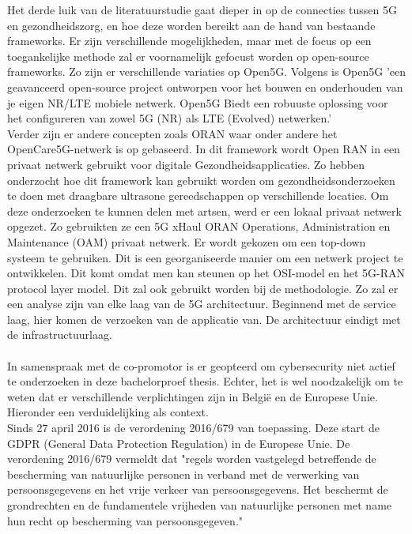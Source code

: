Het derde luik van de literatuurstudie gaat dieper in op de connecties tussen 5G en gezondheidszorg, en hoe deze worden bereikt aan de hand van bestaande frameworks. Er zijn verschillende mogelijkheden, maar met de focus op een toegankelijke methode zal er voornamelijk gefocust worden op open-source frameworks. Zo zijn er verschillende variaties op Open5G. Volgens \textcite{Open5GS2024} is Open5G 'een geavanceerd open-source project ontworpen voor het bouwen en onderhouden van je eigen NR/LTE mobiele netwerk. Open5G Biedt een robuuste oplossing voor het configureren van zowel 5G (NR) als LTE (Evolved) netwerken.' \\ Verder zijn er andere concepten zoals ORAN waar onder andere het OpenCare5G-netwerk is op gebaseerd. In dit framework wordt Open RAN in een privaat netwerk gebruikt voor digitale Gezondheidsapplicaties. Zo hebben \textcite{de2023opencare5g} onderzocht hoe dit framework kan gebruikt worden om gezondheidsonderzoeken te doen met draagbare ultrasone gereedschappen op verschillende locaties. Om deze onderzoeken te kunnen delen met artsen, werd er een lokaal privaat netwerk opgezet. Zo gebruikten ze een 5G xHaul ORAN Operations, Administration en Maintenance (OAM) privaat netwerk. Er wordt gekozen om een top-down systeem te gebruiken. Dit is een georganiseerde manier om een netwerk project te ontwikkelen. Dit komt omdat men kan steunen op het OSI-model en het 5G-RAN protocol layer model. Dit zal ook gebruikt worden bij de methodologie. Zo zal er een analyse zijn van elke laag van de 5G architectuur. Beginnend met de service laag, hier komen de verzoeken van de applicatie van. De architectuur eindigt met de infrastructuurlaag. \autocite{de2023opencare5g}
\\\\
In samenspraak met de co-promotor is er geopteerd om cybersecurity niet actief te onderzoeken in deze bachelorproef thesis. Echter, het is wel noodzakelijk om te weten dat er verschillende verplichtingen zijn in België en de Europese Unie. Hieronder een verduidelijking als context.
\\
Sinds 27 april 2016 is de verordening 2016/679 van toepassing. Deze start de GDPR (General Data Protection Regulation) in de Europese Unie. De verordening 2016/679 vermeldt dat "regels worden vastgelegd betreffende de bescherming van natuurlijke personen in verband met de verwerking van persoonsgegevens en het vrije verkeer van persoonsgegevens. Het beschermt de grondrechten en de fundamentele vrijheden van natuurlijke personen met name hun recht op bescherming van persoonsgegeven."\\ \autocite{gdpr2016} 
